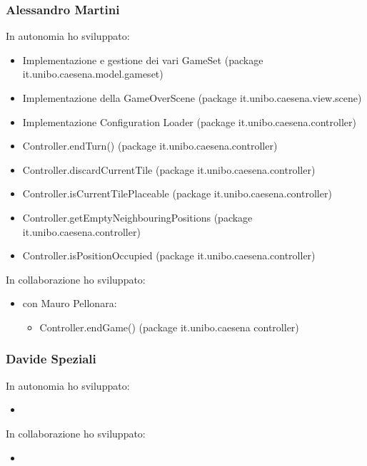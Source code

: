 \subsubsection*{Alessandro Martini}
In autonomia ho sviluppato:
\begin{itemize}
    \item Implementazione e gestione dei vari GameSet (package it.unibo.caesena.model.gameset)
    \item Implementazione della GameOverScene (package it.unibo.caesena.view.scene)
    \item Implementazione Configuration Loader (package it.unibo.caesena.controller)
    \item Controller.endTurn() (package it.unibo.caesena.controller)
    \item Controller.discardCurrentTile (package it.unibo.caesena.controller)
    \item Controller.isCurrentTilePlaceable (package it.unibo.caesena.controller)
    \item Controller.getEmptyNeighbouringPositions (package it.unibo.caesena.controller)
    \item Controller.isPositionOccupied (package it.unibo.caesena.controller)
\end{itemize}
In collaborazione ho sviluppato:
\begin{itemize}
    \item con Mauro Pellonara:
    \begin{itemize}
        \item Controller.endGame() (package it.unibo.caesena controller)
    \end{itemize}
\end{itemize}

\subsubsection*{Davide Speziali}
In autonomia ho sviluppato:
\begin{itemize}
    \item
\end{itemize}
In collaborazione ho sviluppato:
\begin{itemize}
    \item
\end{itemize}

